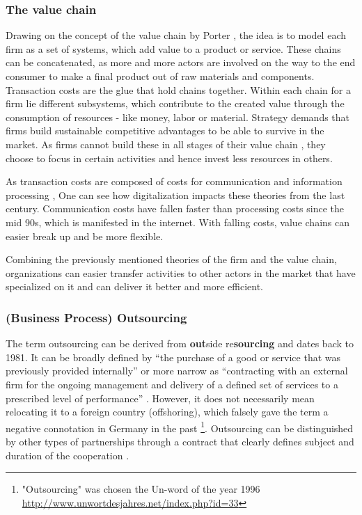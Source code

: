 		\subsubsection{The value chain}
		Drawing on the concept of the value chain by Porter \cite{porter1985}, the idea is to model each firm as a set of systems, which add value to a product or service. These chains can be concatenated, as more and more actors are involved on the way to the end consumer to make a final product out of raw materials and components. Transaction costs are the glue that hold chains together. Within each chain for a firm lie different subsystems, which contribute to the created value through the consumption of resources - like money, labor or material. Strategy demands that firms build sustainable competitive advantages to be able to survive in the market. As firms cannot build these in all stages of their value chain \cite{Ramachandran2004}, they choose to focus in certain activities and hence invest less resources in others. 
		
		As transaction costs are composed of costs for communication and information processing \cite{evansted}, One can see how digitalization impacts these theories from the last century. Communication costs have fallen faster than processing costs since the mid 90s, which is manifested in the internet. With falling costs, value chains can easier break up and be more flexible.
		
		Combining the previously mentioned theories of the firm and the value chain, organizations can easier transfer activities to other actors in the market that have specialized on it and can deliver it better and more efficient.  
		
			\subsubsection{(Business Process) Outsourcing}
		The term outsourcing can be derived from \textbf{out}side re\textbf{sourcing} and dates back to 1981. It can be broadly defined by \enquote{the purchase of a good or service that was previously provided internally} \citep[]{lacity1993} or more narrow as \enquote{contracting with an external firm for the ongoing management and delivery of a defined set of services to a prescribed level of performance} \citep[]{cohen2006multisourcing} . However, it does not necessarily mean relocating it to a foreign country (offshoring), which falsely gave the term a negative connotation in Germany in the past \footnote{ "Outsourcing" was chosen the Un-word of the year 1996 \url{http://www.unwortdesjahres.net/index.php?id=33}}. Outsourcing can be distinguished by other types of partnerships through a contract that clearly defines subject and duration of the cooperation . 
		
